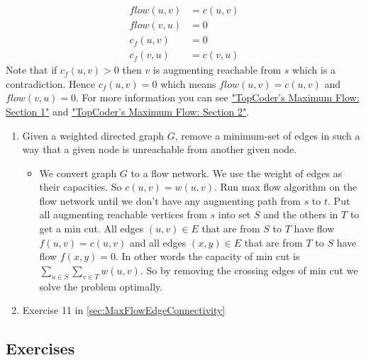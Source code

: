 \documentclass{book}
\begin{document}
	\begin{equation*}
		\begin{split}
		flow(u, v) &= c(u, v) \\
		flow(v, u) &= 0 \\
		c_f(u, v) &= 0 \\
		c_f(v, u) &= c(v, u)
		\end{split}
	\end{equation*}
	Note that if $c_f(u, v) > 0$ then $v$ is augmenting reachable from $s$ which is a contradiction. Hence $c_f(u, v) = 0$ which means $flow(u, v) = c(u, v)$ and $flow(v, u) = 0$. For more information you can see \href{https://www.topcoder.com/community/data-science/data-science-tutorials/maximum-flow-section-1/}{"TopCoder's Maximum Flow: Section 1"} and \href{https://www.topcoder.com/community/data-science/data-science-tutorials/maximum-flow-section-2/}{"TopCoder's Maximum Flow: Section 2"}.
	\begin{enumerate}
		\item Given a weighted directed graph $G$, remove a minimum-set of edges in such a way that a given node is unreachable from another given node.
		\begin{itemize}
			\item We convert graph $G$ to a flow network. We use the weight of edges as their capacities. So $c(u, v) = w(u, v)$. Run max flow algorithm on the flow network until we don't have any augmenting path from $s$ to $t$. Put all augmenting reachable vertices from $s$ into set $S$ and the others in $T$ to get a min cut. All edges $(u, v) \in E$ that are from $S$ to $T$ have flow $f(u, v) = c(u, v)$ and all edges $(x, y) \in E$ that are from $T$ to $S$ have flow $f(x, y) = 0$. In other words the capacity of min cut is $\sum_{u \in S}\sum_{v \in T}w(u, v)$. So by removing the crossing edges of min cut we solve the problem optimally.
		\end{itemize}
		\item Exercise 11 in \ref{sec:MaxFlowEdgeConnectivity}
	\end{enumerate}
	\subsection{Exercises}
\end{document}
